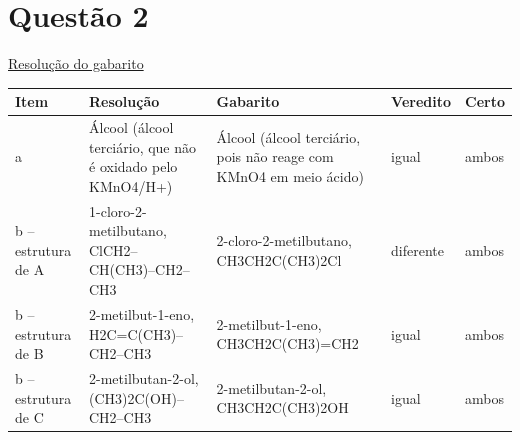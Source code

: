 \documentclass{article}%
\begin{document}
\section*{Questão 2}%
\href{https://poliedroresolve.sistemapoliedro.com.br/vestibulares/ime/2026/ime-2-fase-dia-3-25-10-2025-2-fase-dia-3/dissertativa-2-quimica-2-fase-dia-3-ime-2026}{Resolução do gabarito}\par\smallskip%
\begin{longtable}{@{}p{} p{} p{} p{} p{}@{}}\toprule Item & Resolução & Gabarito & Veredito & Certo \\ \midrule
a & Álcool (álcool terciário, que não é oxidado pelo KMnO4/H+) & Álcool (álcool terciário, pois não reage com KMnO4 em meio ácido) & igual & ambos \\
b -- estrutura de A & 1{-}cloro{-}2{-}metilbutano, ClCH2--CH(CH3)--CH2--CH3 & 2{-}cloro{-}2{-}metilbutano, CH3CH2C(CH3)2Cl & diferente & ambos \\
b -- estrutura de B & 2{-}metilbut{-}1{-}eno, H2C=C(CH3)--CH2--CH3 & 2{-}metilbut{-}1{-}eno, CH3CH2C(CH3)=CH2 & igual & ambos \\
b -- estrutura de C & 2{-}metilbutan{-}2{-}ol, (CH3)2C(OH)--CH2--CH3 & 2{-}metilbutan{-}2{-}ol, CH3CH2C(CH3)2OH & igual & ambos \\
\bottomrule\end{longtable}%
\end{document}
